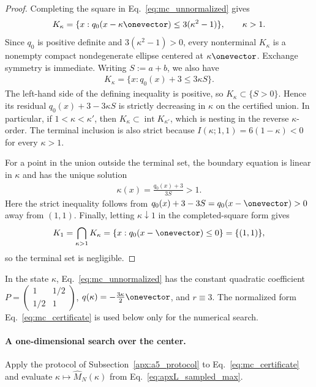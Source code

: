 \documentclass{article}
\begin{document}
\begin{proof}
Completing the square in Eq.~\eqref{eq:mc_unnormalized} gives
\begin{align}
    K_\kappa
    =\{x:q_0(x-\kappa\onevector)\le3(\kappa^2-1)\},
    \qquad \kappa>1.
\end{align}
Since $q_0$ is positive definite and $3(\kappa^2-1)>0$, every nonterminal
$K_\kappa$ is a nonempty compact nondegenerate ellipse centered at
$\kappa\onevector$. Exchange symmetry is immediate.
Writing $S:=a+b$, we also have
\begin{align}
    K_\kappa=\{x:q_0(x)+3\le3\kappa S\}.
    \label{eq:mc_sublevel_linear_kappa}
\end{align}
The left-hand side of the defining inequality is positive, so
$K_\kappa\subset\{S>0\}$. Hence its residual
$q_0(x)+3-3\kappa S$ is strictly decreasing in $\kappa$ on the certified
union. In particular, if $1<\kappa<\kappa'$, then
$K_\kappa\subset\operatorname{int}K_{\kappa'}$, which is nesting in the
reverse $\kappa$-order. The terminal inclusion is also strict because
$I(\kappa;1,1)=6(1-\kappa)<0$ for every $\kappa>1$.

For a point in the union outside the terminal set, the boundary equation is
linear in $\kappa$ and has the unique solution
\begin{align}
    \kappa(x)=\frac{q_0(x)+3}{3S}>1.
\end{align}
Here the strict inequality follows from
$q_0(x)+3-3S=q_0(x-\onevector)>0$ away from $(1,1)$.
Finally, letting $\kappa\downarrow1$ in the completed-square form gives
\begin{align}
    K_1=\bigcap_{\kappa>1}K_\kappa
    =\{x:q_0(x-\onevector)\le0\}=\{(1,1)\},
\end{align}
so the terminal set is negligible.
\end{proof}

In the state $\kappa$, Eq.~\eqref{eq:mc_unnormalized} has the constant quadratic
coefficient
$P=\left(\begin{smallmatrix}1&1/2\\1/2&1\end{smallmatrix}\right)$,
$q(\kappa)=-\tfrac{3\kappa}{2}\onevector$, and $r\equiv3$. The normalized form
Eq.~\eqref{eq:mc_certificate} is used below only for the numerical search.

\paragraph{A one-dimensional search over the center.}
Apply the protocol of Subsection~\ref{apx:a5_protocol} to
Eq.~\eqref{eq:mc_certificate} and evaluate
$\kappa\mapsto\widehat M_N(\kappa)$ from Eq.~\eqref{eq:apxL_sampled_max}.
\end{document}
